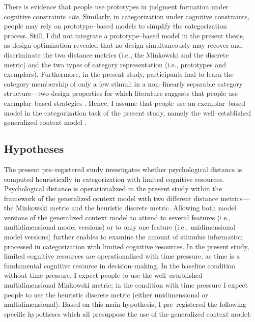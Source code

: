 \documentclass[a4paper,man,natbib]{apa6}
\begin{document}
There is evidence that people use prototypes in judgment formation under cognitive constraints \textit{cite}. Similarly, in categorization under cognitive constraints, people may rely on prototype--based models to simplify the categorization process. Still, I did not integrate a prototype--based model in the present thesis, as design optimization revealed that no design simultaneously may recover and discriminate the two distance metrics (i.e., the Minkowski and the discrete metric) and the two types of category representation (i.e., prototypes and exemplars). Furthermore, in the present study, participants had to learn the category membership of only a few stimuli in a non--linearly separable category structure---two design properties for which literature suggests that people use exemplar--based strategies \citep{smith1998prototypes, smith2000thirty}. Hence, I assume that people use an exemplar--based model in the categorization task of the present study, namely the well--established generalized context model \citep{nosofsky1986attention}.

\subsection{Hypotheses}
The present pre--registered study investigates whether psychological distance is computed heuristically in categorization with limited cognitive resources. Psychological distance is operationalized in the present study within the framework of the generalized context model \citep{nosofsky1989further} with two different distance metrics---the Minkowski metric and the heuristic discrete metric. Allowing both model versions of the generalized context model to attend to several features (i.e., multidimensional model versions) or to only one feature (i.e., unidimensional model versions) further enables to examine the amount of stimulus information processed in categorization with limited cognitive resources. In the present study, limited cognitive resources are operationalized with time pressure, as time is a fundamental cognitive resource in decision--making. In the baseline condition without time pressure, I expect people to use the well--established multidimensional Minkowski metric; in the condition with time pressure I expect people to use the heuristic discrete metric (either unidimensional or multidimensional). Based on this main hypothesis, I pre--registered the following specific hypotheses which all presuppose the use of the generalized context model: 
\end{document}
